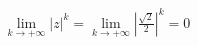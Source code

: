 \documentclass[preview]{standalone}
\begin{document}
\begin{align*}
\lim_{k \rightarrow +\infty}|z|^k = \lim_{k \rightarrow +\infty}|\frac{\sqrt{2}}{2}|^k = 0
\end{align*}
\end{document}
